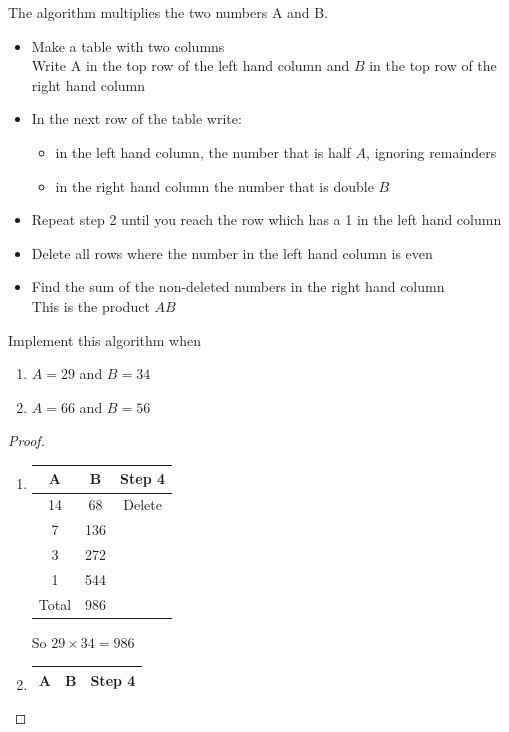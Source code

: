 \documentclass[a4paper]{article}
\begin{document}
\begin{eg}
The algorithm multiplies the two numbers A and B.
\begin{itemize}
\item Make a table with two columns\\Write A in the top row of the left hand column and $B$ in the top row of the right hand column
\item In the next row of the table write: \begin{itemize}\item in the left hand column, the number that is half $A$, ignoring remainders \item in the right hand column the number that is double $B$ \end{itemize}
\item Repeat step 2 until you reach the row which has a 1 in the left hand column
\item Delete all rows where the number in the left hand column is even
\item Find the sum of the non-deleted numbers in the right hand column\\This is the product $AB$
\end{itemize}
Implement this algorithm when
\begin{enumerate}
\item $A=29$ and $B=34$
\item $A=66$ and $B=56$
\end{enumerate}
\begin{proof}
\begin{centering}
\begin{enumerate}
\item \begin{tabular}{|c|c|c|}
          \hline
          A&B& Step 4\\
          \hline
          14&68&Delete\\
          \hline
          7&136& \\
          \hline
          3&272 &\\
          \hline
          1&544 &\\
          \hline
          Total & 986&\\
          \hline          
          \end{tabular}
          So $29 \times 34 =986$
\item \begin{tabular}{|c|c|c|}
         \hline
          A&B&Step 4\\
          \hline

\end{tabular}
\end{enumerate}
\end{centering}
\end{proof}
\end{eg}
\end{document}
